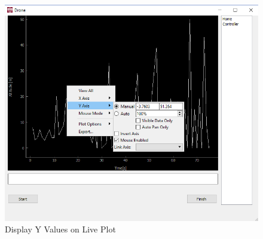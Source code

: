 \begin{figure}[H]
	\includegraphics[width=\linewidth]{plot2.png}
	\caption{Display Y Values on Live Plot}
	\label{fig:plot2}
\end{figure}



